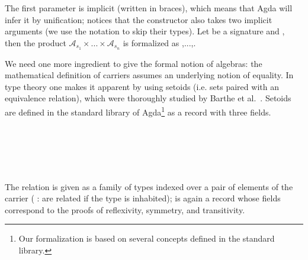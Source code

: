 \noindent The first parameter  is implicit (written in
braces), which means that Agda will infer it by unification; notices
that the constructor
 also
takes two implicit arguments (we use the notation  to
skip their types). Let  be a signature and
\AgdaSpace\AgdaSymbol{:}\AgdaSpace{}
  , then the product
$\mathcal{A}_{s_1} \times ... \times \mathcal{A}_{s_n}$ is formalized
as   \AgdaSymbol{[}
,...,\AgdaSymbol{]}.

We need one more ingredient to give the formal notion of algebras: the
mathematical definition of carriers assumes an underlying notion of
equality.  In type theory one makes it apparent by using setoids (i.e.
sets paired with an equivalence relation), which were thoroughly
studied by Barthe et al.~\cite{barthe-setoids-2003}. Setoids are
defined in the standard library \cite{danielsson-agdalib} of
Agda\footnote{Our formalization is based on several concepts defined
  in the standard library.} as a record with three
fields.

\begin{code}
\>[0]\AgdaSpace{}%
\AgdaSpace{}%
\AgdaSymbol{:}\AgdaSpace{}%
\AgdaSpace{}%
\<%
\\
\>[0][@{}l@{\AgdaIndent{0}}]%
\>[2]\<%
\\
\>[2][@{}l@{\AgdaIndent{0}}]%
\>[4]%
\>[18]\AgdaSymbol{:}\AgdaSpace{}%
\<%
\\
%
\>[4]%
\>[18]\AgdaSymbol{:}\AgdaSpace{}%
\AgdaSpace{}%
\AgdaSpace{}%
\AgdaSpace{}%
\AgdaSpace{}%
\<%
\\
%
\>[4]\AgdaSpace{}%
\AgdaSymbol{:}\AgdaSpace{}%
\AgdaSpace{}%
\<%
\end{code}


\noindent The relation is given as a family of types indexed over a pair
of elements of the carrier (  :  are related if the type
\AgdaSpace{}\AgdaSpace{} is inhabited); \AgdaSpace{}%
 is again a record whose fields
correspond to the proofs of reflexivity, symmetry, and transitivity.

